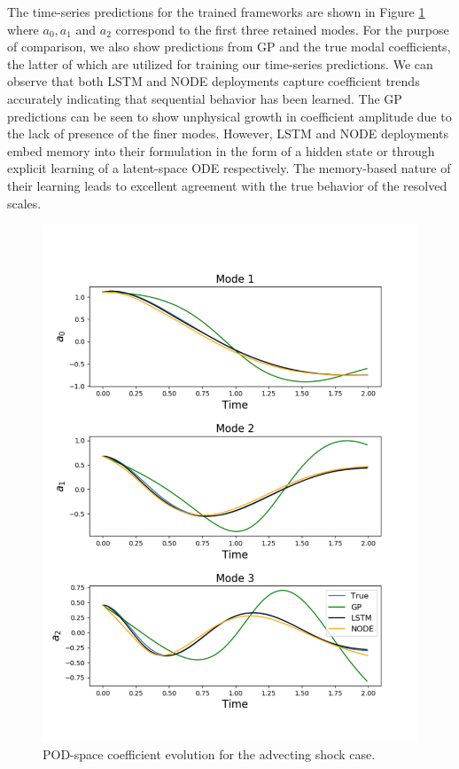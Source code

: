 \documentclass[preprint,12pt]{elsarticle}
\begin{document}
The time-series predictions for the trained frameworks are shown in Figure \ref{Figure3} where $a_0, a_1$ and $a_2$ correspond to the first three retained modes. For the purpose of comparison, we also show predictions from GP and the true modal coefficients, the latter of which are utilized for training our time-series predictions. We can observe that both LSTM and NODE deployments capture coefficient trends accurately indicating that sequential behavior has been learned. The GP predictions can be seen to show unphysical growth in coefficient amplitude due to the lack of presence of the finer modes. However, LSTM and NODE deployments embed memory into their formulation in the form of a hidden state or through explicit learning of a latent-space ODE respectively. The memory-based nature of their learning leads to excellent agreement with the true behavior of the resolved scales.

\begin{figure}
	\centering
	\includegraphics[width=\textwidth]{Figure_4.pdf}
	\caption{POD-space coefficient evolution for the advecting shock case.}
	\label{Figure3}
\end{figure}
\end{document}
